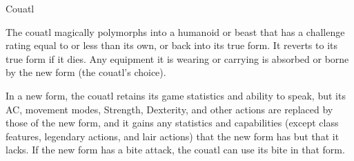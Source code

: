 \begin{DndMonster}[width=\textwidth + 8pt]{Couatl}
\begin{multicols}{2}
The couatl magically polymorphs into a humanoid or beast that has a challenge rating equal to or less than its own, or back into its true form. It reverts to its true form if it dies. Any equipment it is wearing or carrying is absorbed or borne by the new form (the couatl's choice).

In a new form, the couatl retains its game statistics and ability to speak, but its AC, movement modes, Strength, Dexterity, and other actions are replaced by those of the new form, and it gains any statistics and capabilities (except class features, legendary actions, and lair actions) that the new form has but that it lacks. If the new form has a bite attack, the couatl can use its bite in that form.
\end{multicols}
\end{DndMonster}

